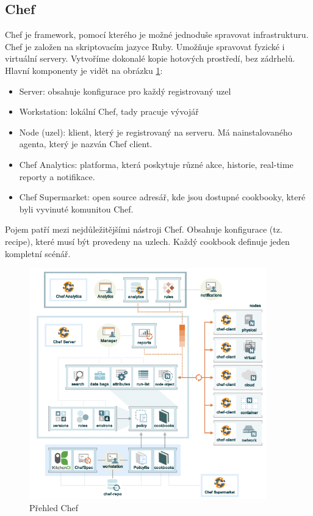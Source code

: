 \subsection{Chef}
Chef je framework, pomocí kterého je možné jednoduše spravovat infrastrukturu. Chef je založen na skriptovacím jazyce Ruby. Umožňuje spravovat fyzické i virtuální servery. Vytvoříme dokonalé kopie hotových prostředí, bez zádrhelů. Hlavní komponenty je vidět na obrázku \ref{fig:chefoverview}:

\begin{itemize}
\item Server: obsahuje konfigurace pro každý registrovaný uzel
\item Workstation: lokální Chef, tady pracuje vývojář
\item Node (uzel): klient, který je registrovaný na serveru. Má nainstalovaného agenta, který je nazván Chef client.
\item Chef Analytics: platforma, která poskytuje různé akce, historie, real-time reporty a notifikace.
\item Chef Supermarket: open source adresář, kde jsou dostupné cookbooky, které byli vyvinuté komunitou Chef.
\end{itemize}

Pojem  patří mezi nejdůležitějšími nástroji Chef. Obsahuje konfigurace (tz. recipe), které musí být provedeny na uzlech. Každý cookbook definuje jeden kompletní scénář. \cite{ChefHandsOnLab}

\begin{figure}[]
  \centering
  \includegraphics[height=10cm]{fig/chef_overview.png}
  \caption{Přehled Chef}
  \label{fig:chefoverview}
\end{figure}

